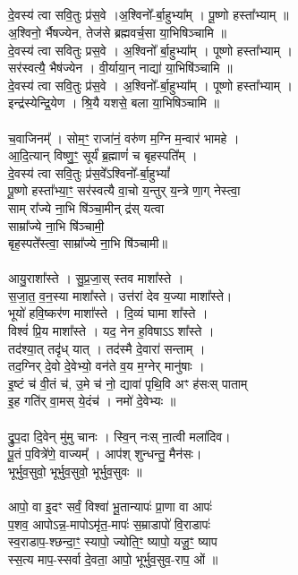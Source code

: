 \subsection{}
दे॒वस्य॑ त्वा सवि॒तुः प्र॑स॒वे ।अ॒श्विनो᳚-र्बा॒हुभ्या᳚म् । पू॒ष्णो हस्ता᳚भ्याम् ॥\\
अ॒श्विनो॒ र्भैषज्येन,  तेज॑से ब्रह्मवर्च॒सा या॒भिषिञ्चामि ॥ \\
दे॒वस्य॑ त्वा सवितुः प्रस॒वे । अ॒श्विनो᳚ र्बा॒हुभ्या᳚म् । पूष्णो हस्ता᳚भ्याम् ।\\
सर॑स्वत्यै॒ भैष॑ज्येन । वी॒र्याया॒न् नाद्या॑ या॒भिषि॑ञ्चामि ॥ \\
दे॒वस्य॑ त्वा सवि॒तुः प्र॑स॒वे । अ॒श्विनो᳚-र्बा॒हुभ्या᳚म् । पूष्णो हस्ता᳚भ्याम् ।\\
इन्द्र॑स्येन्द्रि॒येण । श्रि॒यै यशसे॒ बला या॒भिषिञ्चामि ॥\\
\\
च॒वाजिनम्᳚ । सोम॒ꣳ॒ राजा॑नं॒ वरु॑ण म॒ग्नि म॒न्वार॑ भामहे ।\\
आ॒दि॒त्यान् विष्णु॒ꣳ॒ सूर्यं॑ ब्र॒ह्माणं॑ च बृहस्पति᳚म् ।\\
दे॒वस्य॑ त्वा सवि॒तुः प्र॑स॒वे᳚ऽश्विनो᳚-र्बा॒हुभ्यां᳚ \\
पू॒ष्णो हस्ता᳚भ्या॒ꣳ॒ सर॑स्वत्यै वा॒चो य॒न्तुर् य॒न्त्रे णा॒ग् नेस्त्वा॒ \\
साम् रा᳚ज्ये ना॒भि षि॑ञ्चा॒मीन् द्र॑स् यत्वा \\
साम्रा᳚ज्ये ना॒भि षि॑ञ्चामी॒\\
बृह॒स्पते᳚स्त्वा॒ साम्रा᳚ज्ये ना॒भि षि॑ञ्चामी॥\\
\\
आयु॒राशा᳚स्ते । सु॒प्र॒जा॒स् स्तव माशा᳚स्ते ।\\
स॒जा॒त॒ व॒न॒स्या माशा᳚स्ते। उत्त॑रां देव य॒ज्या माशा᳚स्ते। \\
भूयो॑ हवि॒ष्कर॑ण माशा᳚स्ते । दि॒व्यं घामा शा᳚स्ते ।\\
विश्वं॑ प्रि॒य माशा᳚स्ते । यद॒ नेन ह॒विषाऽऽ शा᳚स्ते ।\\
तद॑श्या॒त् तदृ॑ध् यात् । तद॑स्मै दे॒वारा॑ सन्ताम् ।\\
तद॒ग्निर् दे॒वो दे॒वेभ्यो॒ वन॑ते व॒य म॒ग्नेर् मानु॑षाः ।\\
इ॒ष्टं च॑ वी॒तं च॑, उ॒मे च॑ नो॒ द्यावा॑ पृथि॒वि अꣳ ह॑सःस् पाताम् \\
इ॒ह गति॑र् वा॒मस् ये॒दंच॑ । नमो॑ दे॒वेभ्यः ॥\\
\\
द्रु॒प॒दा दि॒वेन् मु॑मु चानः । स्वि॒न् नःस् ना॒त्वी मला॑दिव। \\
पू॒तं प॒वित्रे॑णे॒ वाज्यम्᳚ । आप॑श् शुन्धन्तु॒ मैन॑सः। \\
भूर्भुव॒सुवो॒ भूर्भुव॒सुवो॒ भूर्भुव॒सुवः ॥\\
\\
आपो॒ वा इ॒दꣳ सर्वं॒ विश्वा॑ भू॒तान्यापः॑ प्रा॒णा वा आपः॑ \\
प॒शव॒ आपोऽन्न॒-मापोऽमृ॑त॒-मापः॑ स॒म्राडापो॑ वि॒राडापः॑ \\
स्व॒राडाप॒-श्छन्दा॒ꣳ॒ स्यापो॒ ज्योति॒ꣳ॒ ष्यापो॒ यजू॒ꣳ॒ ष्याप \\
स्स॒त्य माप॒-स्सर्वा दे॒वता॒ आपो॒ भूर्भुव॒सुव॒-राप॒ ओं ॥\\
